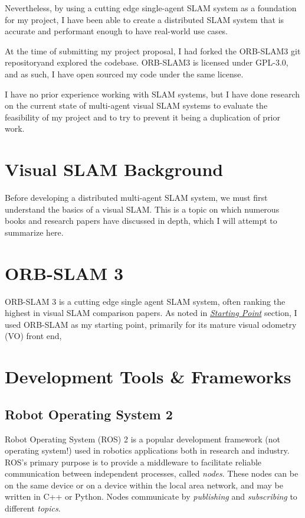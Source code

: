 Nevertheless, by using a cutting edge single-agent SLAM system as a foundation for my project, I have been able to create a distributed SLAM system that is accurate and performant enough to have real-world use cases.

At the time of submitting my project proposal, I had forked the ORB-SLAM3 \autocite{ORBSLAM3_TRO} git repository\footnotemark[1] and explored the codebase. ORB-SLAM3 is licensed under GPL-3.0, and as such, I have open sourced my code under the same license\footnotemark[2].


I have no prior experience working with SLAM systems, but I have done research on the current state of multi-agent visual SLAM systems to evaluate the feasibility of my project and to try to prevent it being a duplication of prior work.

\section{Visual SLAM Background}
\label{sec:visual-slam-background}
Before developing a distributed multi-agent SLAM system, we must first understand the basics of a visual SLAM. This is a topic on which numerous books \autocite{gao2021introduction} and research papers \autocite{durrant2006simultaneous} have discussed in depth, which I will attempt to summarize here.

\section{ORB-SLAM 3}
\label{sec:ORB-SLAM-3}
ORB-SLAM 3 is a cutting edge single agent SLAM system, often ranking the highest in visual SLAM comparison papers. As noted in \hyperref[sec:starting-point]{\textit{Starting Point}} section, I used ORB-SLAM as my starting point, primarily for its mature visual odometry (VO) front end,

\section{Development Tools \& Frameworks}
\label{sec:development-tools-and-frameworks}

\subsection{Robot Operating System 2}
\label{sec:ros-2}
Robot Operating System (ROS) 2 is a popular development framework (not operating system!) used in robotics applications both in research and industry. ROS's primary purpose is to provide a middleware to facilitate reliable communication between independent processes, called \textit{nodes}. These nodes can be on the same device or on a device within the local area network, and may be written in C++ or Python. Nodes communicate by \textit{publishing} and \textit{subscribing} to different \textit{topics}.

